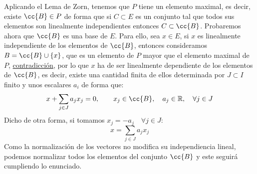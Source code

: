 \begin{ejercicio}
\begin{enumerate}[label=\alph*)]
            Aplicando el Lema de Zorn, tenemos que $P$ tiene un elemento maximal, es decir, existe $\cc{B}\in P$ de forma que si $C\subset E$ es un conjunto tal que todos sus elementos son linealmente independientes entonces $C\subset \cc{B}$. Probaremos ahora que $\cc{B}$ es una base de $E$. Para ello, sea $x\in E$, si $x$ es linealmente independiente de los elementos de $\cc{B}$, entonces consideramos $B = \cc{B}\cup \{x\}$, que es un elemento de $P$ mayor que el elemento maximal de $P$, \underline{contradicción}, por lo que $x$ ha de ser linealmente dependiente de los elementos de $\cc{B}$, es decir, existe una cantidad finita de ellos determinada por $J\subset I$ finito y unos escalares $a_i$ de forma que:
            \begin{equation*}
                x + \sum_{j\in J}a_j x_j = 0, \qquad x_j \in \cc{B}, \quad a_j\in \mathbb{R}, \quad \forall j\in J
            \end{equation*}
            Dicho de otra forma, si tomamos $x_j = -a_j \quad \forall j\in J$:
            \begin{equation*}
                x = \sum_{j\in J} a_jx_j
            \end{equation*}
            Como la normalización de los vectores no modifica su independiencia lineal, podemos normalizar todos los elementos del conjunto $\cc{B}$ y este seguirá cumpliendo lo enunciado.


\end{enumerate}
\end{ejercicio}
